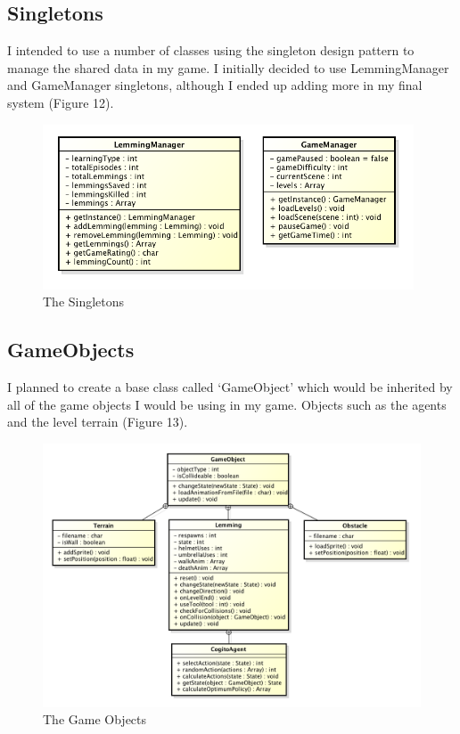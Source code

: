 \documentclass[a4paper,oneside]{report}
\begin{document}
\subsection{Singletons}

I intended to use a number of classes using the singleton design pattern to manage the shared data in my game. I initially decided to use LemmingManager and GameManager singletons, although I ended up adding more in my final system (Figure 12).

\begin{figure}[h!]
  \centering
    \includegraphics[width=110mm]{sources/images/Singletons}
    \caption{The Singletons}
\end{figure}

\subsection{GameObjects}

I planned to create a base class called `GameObject' which would be inherited by all of the game objects I would be using in my game. Objects such as the agents and the level terrain (Figure 13).

\begin{figure}[h!]
  \centering
    \includegraphics[width=140mm]{sources/images/GameObjects}
    \caption{The Game Objects}
\end{figure}
	
\end{document}
